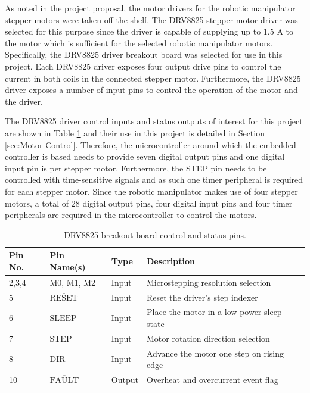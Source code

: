 As noted in the project proposal, the motor drivers for the robotic manipulator stepper motors were taken off-the-shelf. The DRV8825 stepper motor driver was selected for this purpose since the driver is capable of supplying up to 1.5 A to the motor which is sufficient for the selected robotic manipulator motors. Specifically, the DRV8825 driver breakout board was selected for use in this project. Each DRV8825 driver exposes four output drive pins to control the current in both coils in the connected stepper motor. Furthermore, the DRV8825 driver exposes a number of input pins to control the operation of the motor and the driver.

The DRV8825 driver control inputs and status outputs of interest for this project are shown in Table \ref{tab:drv8825-input-pins} and their use in this project is detailed in Section \ref{sec:Motor Control}. Therefore, the microcontroller around which the embedded controller is based needs to provide seven digital output pins and one digital input pin is per stepper motor. Furthermore, the STEP pin needs to be controlled with time-sensitive signals and as such one timer peripheral is required for each stepper motor. Since the robotic manipulator makes use of four stepper motors, a total of 28 digital output pins, four digital input pins and four timer peripherals are required in the microcontroller to control the motors.

\begin{table}[H]
	\renewcommand{\arraystretch}{1.3}
	\centering
	\begin{tabular}{|>{\raggedright}m{1.5cm}|>{\raggedright}m{2.3cm}|>{\raggedright}m{1.5cm}|>{\raggedright\arraybackslash}m{8cm}|}
		\hline
		\textbf{Pin No.} & \textbf{Pin Name(s)} & \textbf{Type} & \textbf{Description} \\
		\hline
		2,3,4 & M0, M1, M2 & Input & Microstepping resolution selection \\
		\hline
		5 & $\overline{\text{RESET}}$ & Input & Reset the driver's step indexer \\
		\hline
		6 & $\overline{\text{SLEEP}}$ & Input & Place the motor in a low-power sleep state \\
		\hline
		7 & STEP & Input & Motor rotation direction selection \\
		\hline
		8 & DIR & Input & Advance the motor one step on rising edge \\
		\hline
		10 & $\overline{\text{FAULT}}$ & Output & Overheat and overcurrent event flag \\
		\hline
	\end{tabular}
	\caption[Caption for LOF]{\label{tab:drv8825-input-pins}DRV8825 breakout board control and status pins.\footnotemark}
\end{table}


